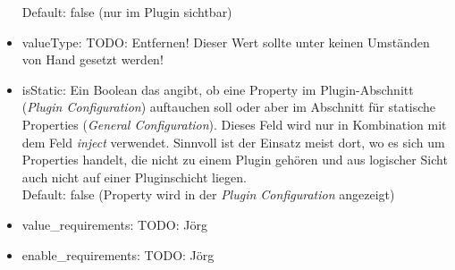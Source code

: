 \documentclass[a4paper, 11pt]{article} %
\begin{document}
\begin{itemize}
	Default: false (nur im Plugin sichtbar)
	\item valueType: TODO: Entfernen! Dieser Wert sollte unter keinen Umständen von Hand gesetzt werden! 
	\item isStatic: Ein Boolean das angibt, ob eine Property im Plugin-Abschnitt (\emph{Plugin Configuration}) auftauchen soll oder aber im Abschnitt für statische Properties (\emph{General Configuration}). Dieses Feld wird nur in Kombination mit dem Feld \emph{inject} verwendet. Sinnvoll ist der Einsatz meist dort, wo es sich um Properties handelt, die nicht zu einem Plugin gehören und aus logischer Sicht auch nicht auf einer Pluginschicht liegen.\\
	Default: false (Property wird in der \emph{Plugin Configuration} angezeigt)
	\item value\_requirements: TODO: Jörg
	\item enable\_requirements: TODO: Jörg
\end{itemize}
\end{document}
